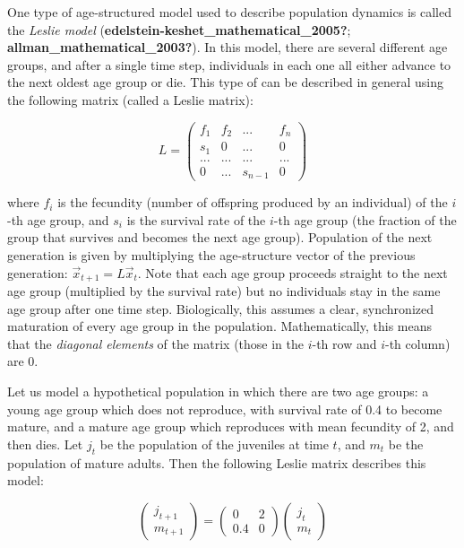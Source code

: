 \documentclass[
  letterpaper,
  DIV=11,
  numbers=noendperiod]{scrreprt}
\begin{document}
One type of age-structured model used to describe population dynamics is
called the \emph{Leslie model}
(\textbf{edelstein-keshet\_mathematical\_2005?};
\textbf{allman\_mathematical\_2003?}). In this model, there are several
different age groups, and after a single time step, individuals in each
one all either advance to the next oldest age group or die. This type of
can be described in general using the following matrix (called a Leslie
matrix):

\[
L = \left(\begin{array}{cccc}f_1 & f_2 & ... & f_n \\s_1 & 0 & ... & 0 \\... & ... &...& ... \\0 & ... & s_{n-1}& 0\end{array}\right)
\]

where \(f_i\) is the fecundity (number of offspring produced by an
individual) of the \(i\)-th age group, and \(s_i\) is the survival rate
of the \(i\)-th age group (the fraction of the group that survives and
becomes the next age group). Population of the next generation is given
by multiplying the age-structure vector of the previous generation:
\(\vec x_{t+1} = L \vec x_t\). Note that each age group proceeds
straight to the next age group (multiplied by the survival rate) but no
individuals stay in the same age group after one time step.
Biologically, this assumes a clear, synchronized maturation of every age
group in the population. Mathematically, this means that the
\emph{diagonal elements} of the matrix (those in the \(i\)-th row and
\(i\)-th column) are 0.

Let us model a hypothetical population in which there are two age
groups: a young age group which does not reproduce, with survival rate
of 0.4 to become mature, and a mature age group which reproduces with
mean fecundity of 2, and then dies. Let \(j_t\) be the population of the
juveniles at time \(t\), and \(m_t\) be the population of mature adults.
Then the following Leslie matrix describes this model:

\[
\left(\begin{array}{c}j_{t+1}\\ m_{t+1}\end{array}\right) =  \left(\begin{array}{cc}0 & 2 \\0.4 & 0\end{array}\right) \left(\begin{array}{c}j_{t}\\ m_{t}\end{array}\right)
\]
\end{document}
